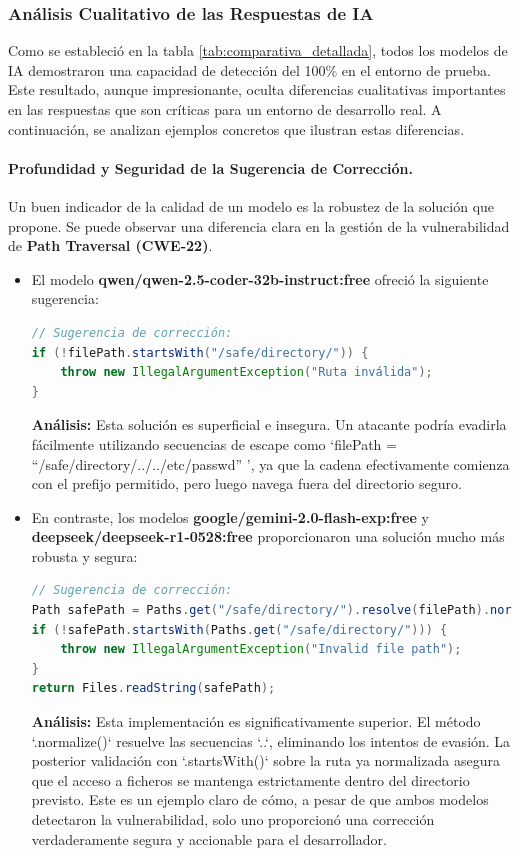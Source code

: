 \subsubsection{Análisis Cualitativo de las Respuestas de IA}

Como se estableció en la tabla \ref{tab:comparativa_detallada}, todos los modelos de IA demostraron una capacidad de detección del 100\% en el entorno de prueba. Este resultado, aunque impresionante, oculta diferencias cualitativas importantes en las respuestas que son críticas para un entorno de desarrollo real. A continuación, se analizan ejemplos concretos que ilustran estas diferencias.

\paragraph{Profundidad y Seguridad de la Sugerencia de Corrección.}
Un buen indicador de la calidad de un modelo es la robustez de la solución que propone. Se puede observar una diferencia clara en la gestión de la vulnerabilidad de \textbf{Path Traversal (CWE-22)}.


\begin{itemize}
    \item El modelo \textbf{qwen/qwen-2.5-coder-32b-instruct:free} ofreció la siguiente sugerencia:
    \begin{lstlisting}[language=java,caption={Sugerencia de Qwen para Path Traversal.}]
// Sugerencia de corrección:
if (!filePath.startsWith("/safe/directory/")) {
    throw new IllegalArgumentException("Ruta inválida");
}
    \end{lstlisting}
    \textbf{Análisis:} Esta solución es superficial e insegura. Un atacante podría evadirla fácilmente utilizando secuencias de escape como `filePath = ``/safe/directory/../../etc/passwd'' ', ya que la cadena efectivamente comienza con el prefijo permitido, pero luego navega fuera del directorio seguro.

    \item En contraste, los modelos \textbf{google/gemini-2.0-flash-exp:free} y \textbf{deepseek/deepseek-r1-0528:free} proporcionaron una solución mucho más robusta y segura:
    \begin{lstlisting}[language=java,caption={Sugerencia de Gemini/DeepSeek para Path Traversal.}]
// Sugerencia de corrección:
Path safePath = Paths.get("/safe/directory/").resolve(filePath).normalize();
if (!safePath.startsWith(Paths.get("/safe/directory/"))) {
    throw new IllegalArgumentException("Invalid file path");
}
return Files.readString(safePath);
    \end{lstlisting}
    \textbf{Análisis:} Esta implementación es significativamente superior. El método `.normalize()` resuelve las secuencias `..`, eliminando los intentos de evasión. La posterior validación con `.startsWith()` sobre la ruta ya normalizada asegura que el acceso a ficheros se mantenga estrictamente dentro del directorio previsto. Este es un ejemplo claro de cómo, a pesar de que ambos modelos detectaron la vulnerabilidad, solo uno proporcionó una corrección verdaderamente segura y accionable para el desarrollador.
\end{itemize}

